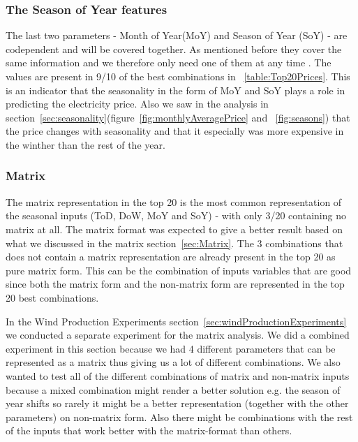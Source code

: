 \subsubsection{The Season of Year features}
The last two parameters - Month of Year(MoY) and Season of Year (SoY) - are codependent and will be covered together. As mentioned before they cover the same information and we therefore only need one of them at any time . The values are present in 9/10 of the best combinations in ~\ref{table:Top20Prices}. This is an indicator that the seasonality in the form of MoY and SoY plays a role in predicting the electricity price. Also we saw in the analysis in section~\ref{sec:seasonality}(figure~\ref{fig:monthlyAveragePrice} and ~\ref{fig:seasons}) that the price changes with seasonality and that it especially was more expensive in the winther than the rest of the year.

\subsubsection{Matrix}
The matrix representation in the top 20 is the most common representation of the seasonal inputs (ToD, DoW, MoY and SoY) - with only 3/20 containing no matrix at all. The matrix format was expected to give a better result based on what we discussed in the matrix section~\ref{sec:Matrix}. The 3 combinations that does not contain a matrix representation are already present in the top 20 as pure matrix form. This can be the combination of inputs variables that are good since both the matrix form and the non-matrix form are represented in the top 20 best combinations.

In the Wind Production Experiments section~\ref{sec:windProductionExperiments} we conducted a separate experiment for the matrix analysis. We did a combined experiment in this section because we had 4 different parameters that can be represented as a matrix thus giving us a lot of different combinations. We also wanted to test all of the different combinations of matrix and non-matrix inputs because a mixed combination might render a better solution e.g. the season of year shifts so rarely it might be a better representation (together with the other parameters) on non-matrix form. Also there might be combinations with the rest of the inputs that work better with the matrix-format than others.

